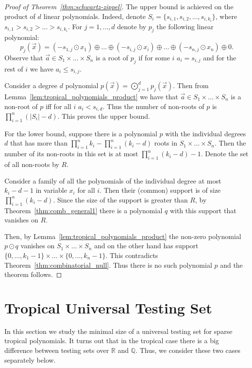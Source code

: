 \documentclass[11pt]{article}
\newcommand{\ta}{\oplus}
\newcommand{\tp}{\odot}
\newcommand{\bb}[1]{\mathbb{#1}}
\begin{document}
\begin{proof}[Proof of Theorem~\ref{thm:schwartz-zippel}]

The upper bound is achieved on the product of $d$ linear polynomials. Indeed, denote $S_i = \{s_{i,1}, s_{i,2}, \ldots, s_{i,{k_i}}\}$, where $s_{i,1} > s_{i,2} > \ldots > s_{i,{k_i}}$. For $j=1,\ldots, d$ denote by $p_j$ the following linear polynomial:
$$
p_j(\vec{x}) = (-s_{1,j} \tp x_1) \ta \ldots \ta (-s_{i,j} \tp x_i) \ta \ldots \ta (-s_{n,j} \tp x_n) \ta 0.
$$
Observe that $\vec{a} \in S_1 \times \ldots \times S_n$ is a root of $p_j$ if for some $i$ $a_i = s_{i,j}$ and for the rest of $i$ we have $a_i \leq s_{i,j}$.

Consider a degree $d$ polynomial
$
p(\vec{x}) = \bigodot_{j=1}^{d} p_{j}(\vec{x}).
$
Then from Lemma~\ref{lem:tropical_polynomials_product} we have that $\vec{a} \in S_1 \times \ldots \times S_n$ is a non-root of $p$ iff for all $i$ $a_i < s_{i,{d}}$. Thus the number of non-roots of $p$ is 
$
\prod_{i=1}^{n} \left( |S_i| - d\right).
$
This proves the upper bound.

For the lower bound, suppose there is a polynomial $p$ with the individual degrees $d$ that has more than $
\prod_{i=1}^{n} k_i - \prod_{i=1}^n \left(k_i-d\right)
$ roots in $S_1\times \ldots \times S_n$. Then the number of its non-roots in this set is at most $\prod_{i=1}^n \left(k_i-d\right) - 1$. Denote the set of all non-roots by $R$.

Consider a family of all the polynomials of the individual degree at most $k_i-d-1$ in variable $x_i$ for all $i$. Then their (common) support is of size $\prod_{i=1}^n \left(k_i-d\right)$. Since the size of the support is greater than $R$, by Theorem~\ref{thm:comb_general1} there is a polynomial $q$ with this support that vanishes on $R$.

Then, by Lemma~\ref{lem:tropical_polynomials_product} the non-zero polynomial $p\tp q$ vanishes on $S_1\times \ldots \times S_n$ and on the other hand has support 
$
\{0,\ldots, k_1-1\}\times \ldots \times \{0,\ldots, k_n-1\}.
$
This contradicts Theorem~\ref{thm:combinatorial_null}. Thus there is no such polynomial $p$ and the theorem follows.
\end{proof}

\section{Tropical Universal Testing Set} \label{sec:univ_set}

In this section we study the minimal size of a universal testing set for sparse tropical polynomials.
It turns out that in the tropical case there is a big difference between testing sets over $\bb{R}$ and $\bb{Q}$. Thus, we consider these two cases separately below.
\end{document}
